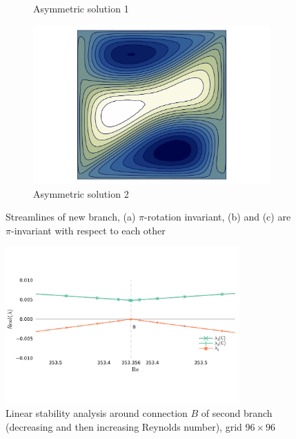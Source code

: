 \begin{figure}[h!]
\begin{subfigure}[b]{0.25\textwidth}
  \caption{Asymmetric solution 1}
\end{subfigure}
\begin{subfigure}[b]{0.25\textwidth}
  \centering
  \includegraphics[trim={3.6cm 0 3.6cm 0},clip,width=\textwidth]{figs/psi_Re375.000_branch2_u_t_bigger.pdf}
  \caption{Asymmetric solution 2}
\end{subfigure}
\caption{Streamlines of new branch, (a) $\pi$-rotation invariant, (b) and (c)
  are $\pi$-invariant with respect to each other}
\label{fig:sol_branch2}
\end{figure}

\begin{figure}[h!]
  \centering
  \includegraphics[trim={0 2.5cm 0 1cm},clip,width=0.8\textwidth]{figs/lsa_branch2_96x96.pdf}
  \caption{Linear stability analysis around connection $B$ of second branch
  (decreasing and then increasing Reynolds number), grid $96 \times 96$}
  \label{fig:lsa_branch2}
\end{figure}

